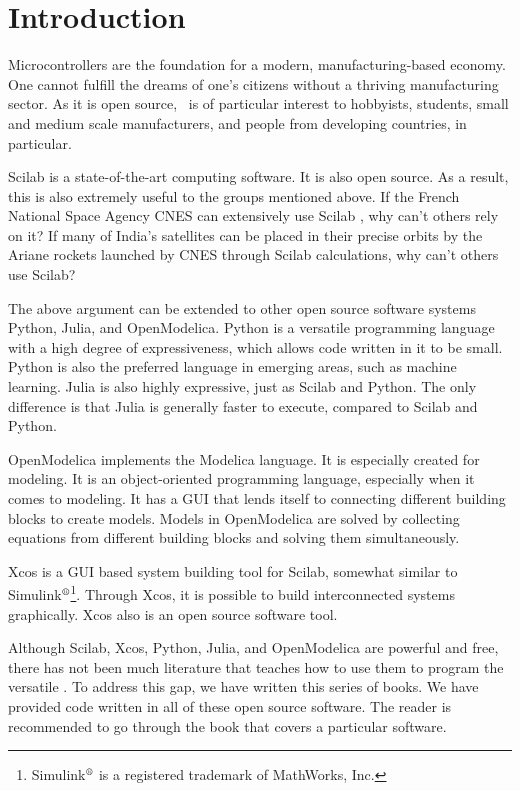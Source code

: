 \chapter{Introduction}
\thispagestyle{empty}
\label{sec:intro}
Microcontrollers are the foundation for a modern, manufacturing-based
economy. One cannot fulfill the dreams of one's citizens without a
thriving manufacturing sector. As it is open source, \arduino\ is of
particular interest to hobbyists, students, small and medium scale
manufacturers, and people from developing countries, in particular.

Scilab is a state-of-the-art computing software. It is also open source. As a result, this is also extremely useful to the groups
mentioned above. If the French National Space Agency CNES can
extensively use Scilab \cite{CNES-Scilab}, why can't others rely on
it? If many of India's satellites can be placed in their precise
orbits by the Ariane rockets launched by CNES through Scilab
calculations, why can't others use Scilab?

The above argument can be extended to other open source software
systems Python, Julia, and OpenModelica. Python is a versatile
programming language with a high degree of expressiveness, which
allows code written in it to be small. Python is also the preferred
language in emerging areas, such as machine learning. Julia is also
highly expressive, just as Scilab and Python. The only difference is
that Julia is generally faster to execute, compared to Scilab and
Python.

OpenModelica implements the Modelica language. It is especially
created for modeling. It is an object-oriented programming language,
especially when it comes to modeling. It has a GUI that lends itself
to connecting different building blocks to create models. Models in
OpenModelica are solved by collecting equations from different
building blocks and solving them simultaneously.

Xcos is a GUI based system building tool for Scilab, somewhat similar
to
Simulink$^{\text{\textregistered}}$\footnote{Simulink$^{\text{\textregistered}}$
  is a registered trademark of MathWorks, Inc.}. Through Xcos, it is
possible to build interconnected systems graphically. Xcos also is an
open source software tool.

Although Scilab, Xcos, Python, Julia, and OpenModelica are powerful and
free, there has not been much literature that teaches how to use them
to program the versatile \arduino. To address this gap, we have
written this series of books. We have provided code written in all of
these open source software. The reader is recommended to go through
the book that covers a particular software.

